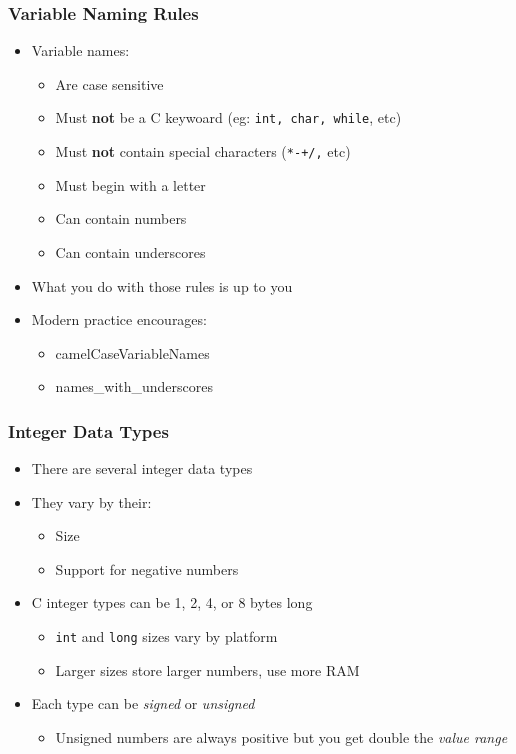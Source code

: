 \documentclass[14pt]{beamer}
\begin{document}
\begin{frame}
\frametitle{Variable Naming Rules}
\begin{itemize}
\item Variable names:
	\begin{itemize}
		\item Are case sensitive
		\item Must \textbf{not} be a C keywoard (eg: \texttt{int, char, while}, etc)
		\item Must \textbf{not} contain special characters (\texttt{*-+/,} etc)
		\item Must begin with a letter
		\item Can contain numbers
		\item Can contain underscores
		
	\end{itemize}
\item What you do with those rules is up to you
\item Modern practice encourages:
	\begin{itemize}
		\item camelCaseVariableNames
		\item names\_with\_underscores
	\end{itemize}
\end{itemize}
\end{frame}

\begin{frame}
\frametitle{Integer Data Types}
\begin{itemize}
\item There are several integer data types
\item They vary by their:
	\begin{itemize}
		\item Size
		\item Support for negative numbers
	\end{itemize}
\item C integer types can be 1, 2, 4, or 8 bytes long
	\begin{itemize}
		\item \texttt{int} and \texttt{long} sizes vary by platform
		\item Larger sizes store larger numbers, use more RAM
	\end{itemize}
\item Each type can be \textit{signed} or \textit{unsigned}
	\begin{itemize}
		\item Unsigned numbers are always positive but you get double the \textit{value range}
	\end{itemize}
\end{itemize}
\end{frame}
\end{document}
